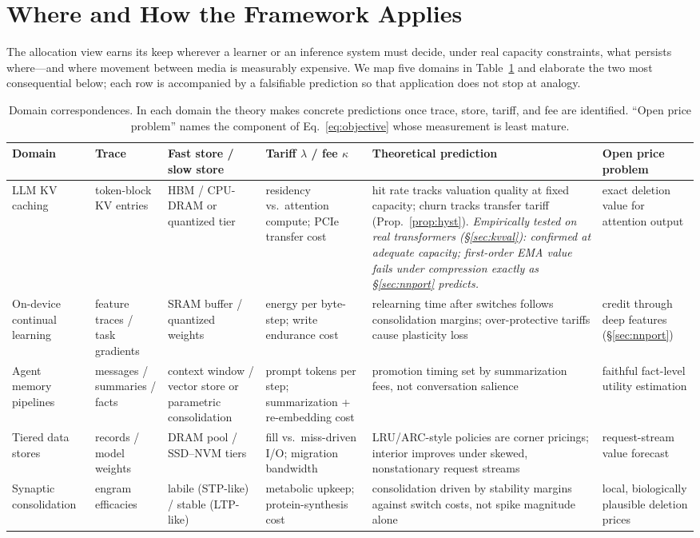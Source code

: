 \documentclass[10pt,twocolumn]{article}
\theoremstyle{definition}
\begin{document}
\section{Where and How the Framework Applies}\label{sec:applications}

The allocation view earns its keep wherever a learner or an inference system must decide, under real
capacity constraints, what persists where---and where movement between media is measurably expensive. We
map five domains in Table~\ref{tab:domains} and elaborate the two most consequential below; each row is
accompanied by a falsifiable prediction so that application does not stop at analogy.

\begin{table}[t]
\centering\small
\caption{Domain correspondences. In each domain the theory makes concrete predictions once trace, store,
tariff, and fee are identified. ``Open price problem'' names the component of Eq.~\eqref{eq:objective} whose
measurement is least mature.}
\label{tab:domains}
\setlength{\tabcolsep}{4pt}
\begin{tabular}{@{}p{1.9cm}p{2.5cm}p{2.6cm}p{2.9cm}p{2.9cm}p{3.1cm}@{}}
\toprule
Domain & Trace & Fast store / slow store & Tariff $\lambda$ / fee $\kappa$ &
Theoretical prediction & Open price problem \\
\midrule
LLM {KV} caching & token-block {KV} entries & {HBM} / {CPU}-{DRAM} or quantized tier & residency vs.\
attention compute; PCIe transfer cost & hit rate tracks valuation quality at fixed capacity; churn tracks
transfer tariff (Prop.~\ref{prop:hyst}). \emph{Empirically tested on real transformers
(\S\ref{sec:kvval}): confirmed at adequate capacity; first-order {EMA} value fails under compression
exactly as \S\ref{sec:nnport} predicts.} & exact deletion value for attention output \\
On-device continual learning & feature traces / task gradients & {SRAM} buffer / quantized weights &
energy per byte-step; write endurance cost & relearning time after switches follows consolidation margins;
over-protective tariffs cause plasticity loss & credit through deep features (\S\ref{sec:nnport}) \\
Agent memory pipelines & messages / summaries / facts & context window / vector store or parametric
consolidation & prompt tokens per step; summarization + re-embedding cost & promotion timing set by
summarization fees, not conversation salience & faithful fact-level utility estimation \\
Tiered data stores & records / model weights & {DRAM} pool / {SSD}--{NVM} tiers & fill vs.\ miss-driven I/O;
migration bandwidth & {LRU}/{ARC}-style policies are corner pricings; interior improves under skewed,
nonstationary request streams & request-stream value forecast \\
Synaptic consolidation & engram efficacies & labile ({STP}-like) / stable ({LTP}-like) & metabolic upkeep;
protein-synthesis cost & consolidation driven by stability margins against switch costs, not spike magnitude
alone & local, biologically plausible deletion prices \\
\bottomrule
\end{tabular}
\end{table}
\end{document}
